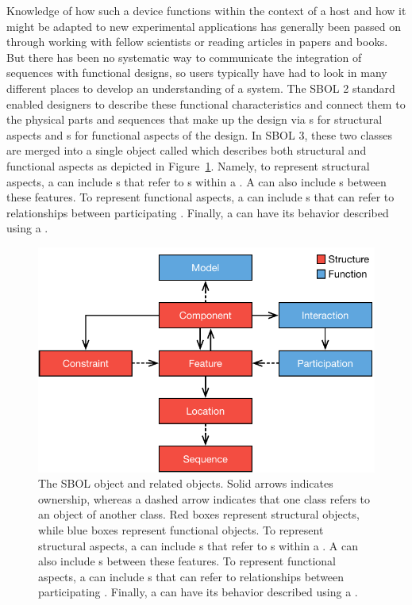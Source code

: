 Knowledge of how such a device functions within the context of a host and how it might be adapted to new experimental applications has generally been passed on through working with fellow scientists or reading articles in papers and books. 
But there has been no systematic way to communicate the integration of sequences with functional designs, so users typically have had to look in many different places to develop an understanding of a system.  The SBOL 2 standard enabled designers to describe these functional characteristics and connect them to the physical parts and sequences that make up the design via s for structural aspects and s for functional aspects of the design.
In SBOL 3, these two classes are merged into a single object called  which describes both structural and functional aspects as depicted in Figure~\ref{images:overview1}.  Namely, to represent structural aspects, a  can include s that refer to s within a .  A  can also include s between these features.  To represent functional aspects, a  can include s that can refer to relationships between participating .  Finally, a  can have its behavior described using a .

\begin{figure}[ht]
\begin{center}
  \includegraphics[scale=0.85]{images/SBOL3-main-classes.pdf}
\caption{The SBOL  object and related objects.  Solid arrows indicates ownership, whereas a dashed arrow indicates that one class refers to an object of another class.  Red boxes represent structural objects, while blue boxes represent functional objects.  To represent structural aspects, a  can include s that refer to s within a .  A  can also include s between these features.  To represent functional aspects, a  can include s that can refer to relationships between participating .  Finally, a  can have its behavior described using a .}
\label{images:overview1}
\end{center}
\end{figure}

